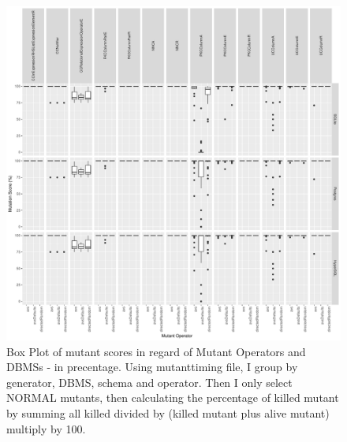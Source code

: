\documentclass[runningheads,a4paper]{llncs}
\begin{document}
\begin{figure}[h]
\centering
\includegraphics[width=\linewidth]{../plots/figure10.pdf}
\caption{Box Plot of mutant scores in regard of Mutant Operators and
DBMSs - in precentage. Using mutanttiming file, I group by generator,
DBMS, schema and operator. Then I only select NORMAL mutants, then
calculating the percentage of killed mutant by summing all killed
divided by (killed mutant plus alive mutant) multiply by 100.}
\end{figure}
\end{document}
